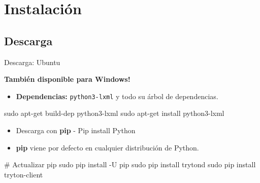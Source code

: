

\section{Instalación}

    \subsection{Descarga}

	\begin{frame}[fragile=singleslide]{Descarga: Ubuntu}

        \begin{center}
            {\color{TurkishRose}\textbf{También disponible para Windows!}}
        \end{center}

        \fontsize{10}{8}\selectfont

        \begin{itemize}
            \item \textbf{Dependencias:} \texttt{python3-lxml} y todo su árbol de dependencias.
        \end{itemize}

        \begin{mycode}[bash]
sudo apt-get build-dep python3-lxml
sudo apt-get install python3-lxml
		\end{mycode}

        \begin{itemize}
            \item Descarga con \textbf{pip} - Pip install Python
            \item \textbf{pip} viene por defecto en cualquier distribución de Python.
        \end{itemize}

        \begin{mycode}[bash]
# Actualizar pip
sudo pip install -U pip
sudo pip install trytond
sudo pip install tryton-client
        \end{mycode}

    \end{frame}

